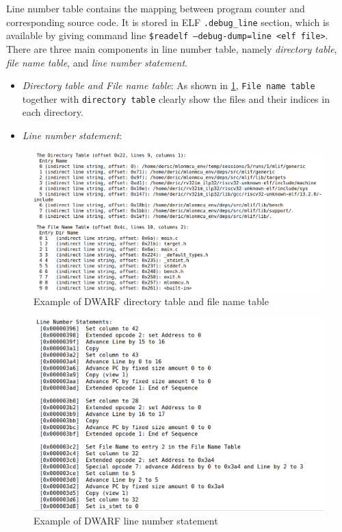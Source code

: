 Line number table contains the mapping between program counter and corresponding source code. It is stored in ELF \texttt{.debug\_line} section, which is available by giving command line \texttt{\$readelf --debug-dump=line <elf file>}. There are three main components in line number table, namely \textit{directory table}, \textit{file name table}, and \textit{line number statement}.

\begin{itemize}
    \item \textit{Directory table and File name table}: As shown in \ref{fig:dwarf_debug_prologue}, \texttt{File name table} together with \texttt{directory table} clearly show the files and their indices in each directory.
    
    \item \textit{Line number statement}: 
\end{itemize}


\begin{figure}
    \centering
    \includegraphics[width=.95\linewidth]{figures/DWARF_debug_prologue.png}
    \caption{Example of DWARF directory table and file name table}
    \label{fig:dwarf_debug_prologue}
\end{figure}

\begin{figure}
    \centering
    \includegraphics[width=.85\linewidth]{figures/DWARF_debug_main.png}
    \caption{Example of DWARF line number statement}
    \label{fig:dwarf_debug_main}
\end{figure}


